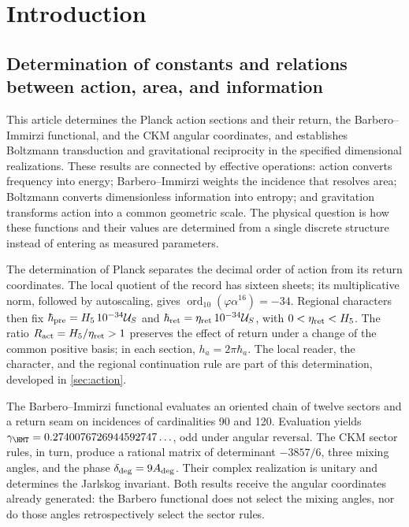 \begingroup
\setlength{\parskip}{1.2pt plus .5pt minus .3pt}
\section{Introduction}

\subsection{Determination of constants and relations between action, area, and information}

This article determines the Planck action sections and their return,
the Barbero--Immirzi functional, and the CKM angular coordinates, and
establishes Boltzmann transduction and gravitational reciprocity in
the specified dimensional realizations. These results are connected
by effective operations: action converts frequency into energy;
Barbero--Immirzi weights the incidence that resolves area; Boltzmann
converts dimensionless information into entropy; and gravitation
transforms action into a common geometric scale. The physical question
is how these functions and their values are determined from a single
discrete structure instead of entering as measured parameters.

The determination of Planck separates the decimal order of action from
its return coordinates. The local quotient of the record has sixteen
sheets; its multiplicative norm, followed by autoscaling, gives
\(\operatorname{ord}_{10}(\varphi\alpha^{16})=-34\).
Regional characters then fix
\(\hbar_{\rm pre}=H_5\,10^{-34}\mathcal U_S\) and
\(\hbar_{\rm ret}=\eta_{\rm ret}\,10^{-34}\mathcal U_S\),
with \(0<\eta_{\rm ret}<H_5\). The ratio
\(R_{\rm act}=H_5/\eta_{\rm ret}>1\) preserves the effect of
return under a change of the common positive basis; in each section,
\(h_a=2\pi\hbar_a\). The local reader, the character, and the regional
continuation rule are part of this determination, developed
in \ref{sec:action}.

The Barbero--Immirzi functional evaluates an oriented chain of twelve
sectors and a return seam on incidences of cardinalities 90
and 120. Evaluation yields
\(\gamma_{\HMT}=0.2740076726944592747\ldots\), odd under angular
reversal. The CKM sector rules, in turn, produce a rational matrix
of determinant \(-3857/6\), three mixing angles, and the phase
\(\delta_{\rm deg}=9A_{\rm deg}\).
Their complex realization is unitary and determines the Jarlskog
invariant. Both results receive the angular coordinates already
generated: the Barbero functional does not select the mixing angles,
nor do those angles retrospectively select the sector rules.


